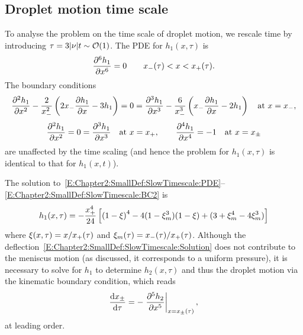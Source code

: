 \subsection{Droplet motion time scale}
To analyse the problem on the time scale of droplet motion, we rescale time by introducing $\tau = 3|\nu| t \sim \mathcal{O}(1)$.  The PDE for $h_1(x,\tau)$ is
\begin{equation}\label{E:Chapter2:SmallDef:SlowTimescale:PDE}
\frac{\partial ^6h_1}{\partial x^6} = 0 \qquad x_{-}(\tau) < x <x_{+}(\tau).
\end{equation}
The boundary conditions
\begin{equation}\label{E:Chapter2:SmallDef:SlowTimescale:BC1}
\frac{\partial ^2 h_1}{\partial x^2} - \frac{2}{x_{-}^2}\left(2x_{-} \frac{\partial h_1}{\partial x} - 3h_1\right)= 0 = \frac{\partial ^3 h_1}{\partial x^3} - \frac{6}{x_{-}^3}\left(x_{-} \frac{\partial h_1}{\partial x} - 2h_1\right) \quad \text{at}~x = x_{-},
\end{equation}
\begin{equation}\label{E:Chapter2:SmallDef:SlowTimescale:BC2}
\frac{\partial ^2 h_1}{\partial x^2} = 0 = \frac{\partial ^3 h_1}{\partial x^3}  \quad \text{at}~x = x_{+}, \qquad  \frac{\partial ^4 h_1}{\partial x^4}  = -1 \quad \text{at}~x = x_{\pm}
\end{equation}
are unaffected by the time scaling (and hence the problem for $h_1(x,\tau)$ is identical to that for $h_1(x,t)$).

The solution to~\eqref{E:Chapter2:SmallDef:SlowTimescale:PDE}--\eqref{E:Chapter2:SmallDef:SlowTimescale:BC2} is
\begin{equation}\label{E:Chapter2:SmallDef:SlowTimescale:Solution}
h_1(x,\tau) =-  \frac{x_{+}^4}{24}\left[\left(1-\xi\right)^4 - 4(1 - \xi_m^3)(1 -\xi) + (3 +\xi_m^4 - 4 \xi_m^3)\right]
\end{equation}
where $\xi(x, \tau) = x/x_{+}(\tau)$ and $\xi_m(\tau) = x_{-}(\tau) /x_{+}(\tau)$. Although the deflection~\eqref{E:Chapter2:SmallDef:SlowTimescale:Solution} does not contribute to the meniscus motion (as discussed, it corresponds to a uniform pressure), it is necessary to solve for $h_1$  to determine $h_2(x, \tau)$ and thus the droplet motion via the kinematic boundary condition, which reads
\begin{equation}\label{E:Chapter2:SmallDef:SlowTimescale:Kinematic}
\frac{\mathrm{d} x_{\pm}}{\mathrm{d} \tau} = -\left.\frac{\partial ^5 h_2}{\partial x^5}\right|_{x = x_\pm(\tau)},
\end{equation}
at leading order.

